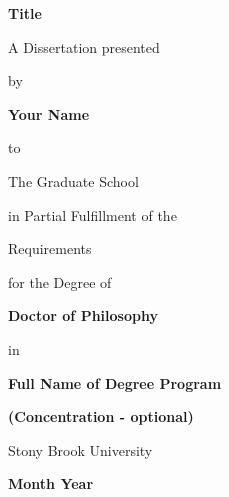 \vspace*{3\baselineskip}
\centerline{\textbf{Title}}
\vspace*{1\baselineskip}
\centerline{A Dissertation presented}
\vspace*{1\baselineskip}
\centerline{by} 
\vspace*{1\baselineskip}
\centerline{\textbf{Your Name}}
\vspace*{1\baselineskip}
\centerline{to} 
\vspace*{1\baselineskip}
\centerline{The Graduate School}
\vspace*{1\baselineskip}
\centerline{in Partial Fulfillment of the}
\vspace*{1\baselineskip}
\centerline{Requirements}
\vspace*{1\baselineskip}
\centerline{for the Degree of}
\vspace*{1\baselineskip}
\centerline{\textbf{Doctor of Philosophy}}
\vspace*{1\baselineskip}
\centerline{in}
\vspace*{1\baselineskip}
\centerline{\textbf{Full Name of Degree Program}}
\vspace*{1\baselineskip}
\centerline{\textbf{(Concentration - optional)}}
\vspace*{2\baselineskip}
\centerline{Stony Brook University}
\vspace*{2\baselineskip}
\centerline{\textbf{Month Year}}     
